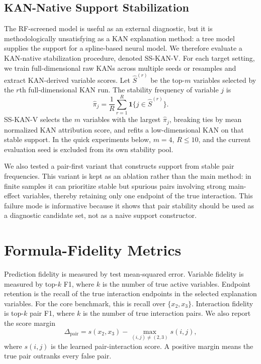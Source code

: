 \documentclass[11pt]{article}
\begin{document}
\subsection{KAN-Native Support Stabilization}

The RF-screened model is useful as an external diagnostic, but it is methodologically unsatisfying as a KAN explanation method: a tree model supplies the support for a spline-based neural model. We therefore evaluate a KAN-native stabilization procedure, denoted SS-KAN-V. For each target setting, we train full-dimensional raw KANs across multiple seeds or resamples and extract KAN-derived variable scores. Let $\widehat{S}^{(r)}$ be the top-$m$ variables selected by the $r$th full-dimensional KAN run. The stability frequency of variable $j$ is
\begin{equation}
    \widehat{\pi}_j
    =
    \frac{1}{R}\sum_{r=1}^{R}
    \mathbf{1}\{j\in \widehat{S}^{(r)}\}.
\end{equation}
SS-KAN-V selects the $m$ variables with the largest $\widehat{\pi}_j$, breaking ties by mean normalized KAN attribution score, and refits a low-dimensional KAN on that stable support. In the quick experiments below, $m=4$, $R\leq 10$, and the current evaluation seed is excluded from its own stability pool.

We also tested a pair-first variant that constructs support from stable pair frequencies. This variant is kept as an ablation rather than the main method: in finite samples it can prioritize stable but spurious pairs involving strong main-effect variables, thereby retaining only one endpoint of the true interaction. This failure mode is informative because it shows that pair stability should be used as a diagnostic candidate set, not as a naive support constructor.

\section{Formula-Fidelity Metrics}

Prediction fidelity is measured by test mean-squared error. Variable fidelity is measured by top-$k$ F1, where $k$ is the number of true active variables. Endpoint retention is the recall of the true interaction endpoints in the selected explanation variables. For the core benchmark, this is recall over $\{x_2,x_3\}$. Interaction fidelity is top-$k$ pair F1, where $k$ is the number of true interaction pairs. We also report the score margin
\begin{equation}
    \Delta_{\mathrm{pair}}
    =
    s(x_2,x_3)
    -
    \max_{(i,j)\neq(2,3)} s(i,j),
    \label{eq:margin}
\end{equation}
where $s(i,j)$ is the learned pair-interaction score. A positive margin means the true pair outranks every false pair.
\end{document}

